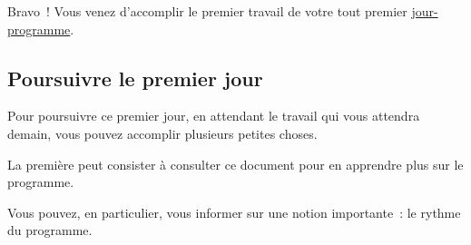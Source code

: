 Bravo~{}! Vous venez d'accomplir le premier travail de votre tout premier \hyperlink{explicationjourprogrammejourreel}{jour-programme}.

\subsection{Poursuivre le premier jour}\hypertarget{poursuivre-le-premier-jour}{}\label{poursuivre-le-premier-jour}

Pour poursuivre ce premier jour, en attendant le travail qui vous attendra demain, vous pouvez accomplir plusieurs petites choses.

La première peut consister à consulter ce document pour en apprendre plus sur le programme.

Vous pouvez, en particulier, vous informer sur une notion importante~{}: le rythme du programme.


